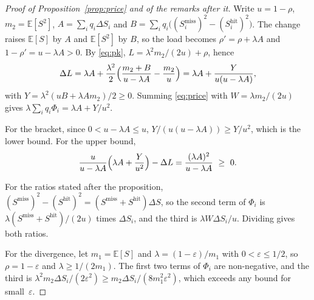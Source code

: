 \documentclass{article}
\theoremstyle{plain}
\theoremstyle{definition}
\theoremstyle{remark}
\newcommand{\E}{\mathbb{E}}
\begin{document}
\begin{proof}[Proof of Proposition~\ref{prop:price} and of the remarks after it]
Write $u=1-\rho$, $m_2=\E[S^2]$,
$A=\sum_iq_i\Delta S_i$ and
$B=\sum_iq_i\bigl((S_i^{\mathrm{miss}})^2-(S_i^{\mathrm{hit}})^2\bigr)$.
The change raises $\E[S]$ by $A$ and $\E[S^2]$ by $B$, so the load
becomes $\rho'=\rho+\lambda A$ and $1-\rho'=u-\lambda A>0$. By
\eqref{eq:pk}, $L=\lambda^2m_2/(2u)+\rho$, hence
\[
  \Delta L=\lambda A+\frac{\lambda^2}{2}\Bigl(\frac{m_2+B}{u-\lambda A}
    -\frac{m_2}{u}\Bigr)
  =\lambda A+\frac{Y}{u(u-\lambda A)},
\]
with $Y=\lambda^2(uB+\lambda Am_2)/2\ge0$. Summing \eqref{eq:price} with
$W=\lambda m_2/(2u)$ gives $\lambda\sum_iq_i\Phi_i=\lambda A+Y/u^2$.

For the bracket, since $0<u-\lambda A\le u$, $Y/(u(u-\lambda A))\ge Y/u^2$, which is
the lower bound. For the upper bound,
\[
  \frac{u}{u-\lambda A}\Bigl(\lambda A+\frac{Y}{u^2}\Bigr)-\Delta L
  =\frac{(\lambda A)^2}{u-\lambda A}\ \ge\ 0 .
\]

For the ratios stated after the proposition, $(S^{\mathrm{miss}})^2-(S^{\mathrm{hit}})^2
=(S^{\mathrm{miss}}+S^{\mathrm{hit}})\Delta S$, so the second term of
$\Phi_i$ is $\lambda(S^{\mathrm{miss}}+S^{\mathrm{hit}})/(2u)$ times
$\Delta S_i$, and the third is $\lambda W\Delta S_i/u$. Dividing gives
both ratios.

For the divergence, let $m_1=\E[S]$ and $\lambda=(1-\varepsilon)/m_1$ with
$0<\varepsilon\le1/2$, so $\rho=1-\varepsilon$ and $\lambda\ge1/(2m_1)$.
The first two terms of $\Phi_i$ are non-negative, and the third is
$\lambda^2m_2\Delta S_i/(2\varepsilon^2)\ge m_2\Delta S_i/(8m_1^2\varepsilon^2)$,
which exceeds any bound for small~$\varepsilon$.
\end{proof}
\end{document}
